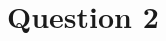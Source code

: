 \documentclass[12pt]{article}
\begin{document}














\section*{Question 2}

\bigskip
\end{document}
